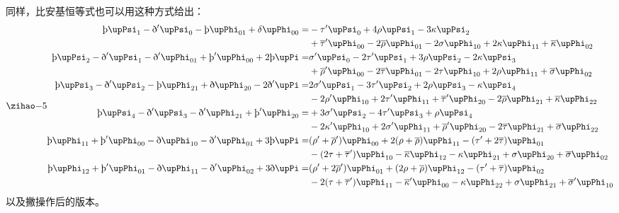 同样，比安基恒等式也可以用这种方式给出：
\begin{equation}
	{\small
		\begin{aligned}
			\text{þ}\upPsi _{1} -\text{ð} '\upPsi _{0} -\text{þ}\upPhi _{01} +\delta \upPhi _{00} = & -\tau '\upPsi _{0} +4\rho \upPsi _{1} -3\kappa \upPsi _{2}\\
			& +\overline{\tau } '\upPhi _{00} -2\overline{\rho } \upPhi _{01} -2\sigma \upPhi _{10} +2\kappa \upPhi _{11} +\overline{\kappa } \upPhi _{02}\\
			\text{þ}\upPsi _{2} -\text{ð} '\upPsi _{1} -\text{ð} '\upPhi _{01} +\text{þ}'\upPhi _{00} +2\text{þ}\upPi = & \sigma '\upPsi _{0} -2\tau '\upPsi _{1} +3\rho \upPsi _{2} -2\kappa \upPsi _{3}\\
			& +\overline{\rho } '\upPhi _{00} -2\overline{\tau } \upPhi _{01} -2\tau \upPhi _{10} +2\rho \upPhi _{11} +\overline{\sigma } \upPhi _{02}\\
			\text{þ}\upPsi _{3} -\text{ð} '\upPsi _{2} -\text{þ}\upPhi _{21} +\text{ð} \upPhi _{20} -2\text{ð} '\upPi = & 2\sigma '\upPsi _{1} -3\tau '\upPsi _{2} +2\rho \upPsi _{3} -\kappa \upPsi _{4}\\
			& -2\rho '\upPhi _{10} +2\tau '\upPhi _{11} +\overline{\tau } '\upPhi _{20} -2\overline{\rho } \upPhi _{21} +\overline{\kappa } \upPhi _{22}\\
			\text{þ}\upPsi _{4} -\text{ð} '\upPsi _{3} -\text{ð} '\upPhi _{21} +\text{þ}'\upPhi _{20} = & +3\sigma '\upPsi _{2} -4\tau '\upPsi _{3} +\rho \upPsi _{4}\\
			& -2\kappa '\upPhi _{10} +2\sigma '\upPhi _{11} +\overline{\rho } '\upPhi _{20} -2\overline{\tau } \upPhi _{21} +\overline{\sigma } \upPhi _{22}\\
			\text{þ}\upPhi _{11} +\text{þ}'\upPhi _{00} -\text{ð} \upPhi _{10} -\text{ð} '\upPhi _{01} +3\text{þ}\upPi = & ( \rho '+\overline{\rho } ') \upPhi _{00} +2( \rho +\overline{\rho }) \upPhi _{11} -( \tau '+2\overline{\tau }) \upPhi _{01}\\
			& -( 2\tau +\overline{\tau } ') \upPhi _{10} -\overline{\kappa } \upPhi _{12} -\kappa \upPhi _{21} +\sigma \upPhi _{20} +\overline{\sigma } \upPhi _{02}\\
			\text{þ}\upPhi _{12} +\text{þ}'\upPhi _{01} -\text{ð} \upPhi _{11} -\text{ð} '\upPhi _{02} +3\text{ð} \upPi = & ( \rho '+2\overline{\rho } ') \upPhi _{01} +(2\rho +\overline{\rho } )\upPhi _{12} -( \tau '+\overline{\tau }) \upPhi _{02}\\
			& -2( \tau +\overline{\tau } ') \upPhi _{11} -\overline{\kappa } '\upPhi _{00} -\kappa \upPhi _{22} +\sigma \upPhi _{21} +\overline{\sigma } '\upPhi _{10}
	\end{aligned}}
	\label{eq:5.84}
\end{equation}
以及撇操作后的版本。



